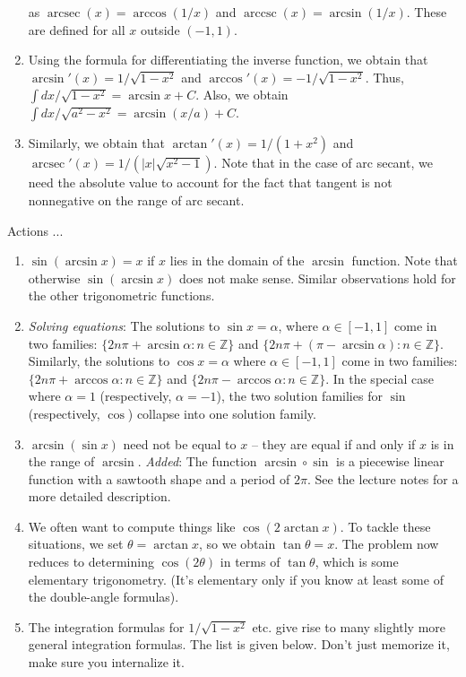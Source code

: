 \documentclass[10pt]{amsart}
\begin{document}
\begin{enumerate}
  as $\operatorname{arcsec}(x) = \arccos(1/x)$ and
  $\operatorname{arccsc}(x) = \arcsin(1/x)$. These are defined for all
  $x$ outside $(-1,1)$.
\item Using the formula for differentiating the inverse function, we
  obtain that $\arcsin'(x) = 1/\sqrt{1 - x^2}$ and $\arccos'(x) =
  -1/\sqrt{1 - x^2}$. Thus, $\int dx/\sqrt{1 - x^2} = \arcsin x +
  C$. Also, we obtain $\int dx/\sqrt{a^2 - x^2} = \arcsin(x/a) + C$.
\item Similarly, we obtain that $\arctan'(x) = 1/(1 + x^2)$ and
  $\operatorname{arcsec}'(x) = 1/(|x|\sqrt{x^2 - 1})$. Note that in
  the case of arc secant, we need the absolute value to account for
  the fact that tangent is not nonnegative on the range of arc secant.
\end{enumerate}

Actions ...

\begin{enumerate}

\item $\sin(\arcsin x) = x$ if $x$ lies in the domain of the $\arcsin$
  function. Note that otherwise $\sin(\arcsin x)$ does not make
  sense. Similar observations hold for the other trigonometric
  functions.
\item {\em Solving equations}: The solutions to $\sin x = \alpha$,
  where $\alpha \in [-1,1]$ come in two families: $\{ 2n\pi + \arcsin
  \alpha : n \in \mathbb{Z} \}$ and $\{ 2n\pi + (\pi - \arcsin \alpha)
  : n \in \mathbb{Z} \}$. Similarly, the solutions to $\cos x =
  \alpha$ where $\alpha \in [-1,1]$ come in two families: $\{ 2n \pi +
  \arccos \alpha: n \in \mathbb{Z} \}$ and $\{ 2n\pi - \arccos \alpha
  : n \in \mathbb{Z} \}$. In the special case where $\alpha = 1$
  (respectively, $\alpha = -1$), the two solution families for $\sin$
  (respectively, $\cos$) collapse into one solution family.
\item $\arcsin(\sin x)$ need not be equal to $x$ -- they are equal if
  and only if $x$ is in the range of $\arcsin$. {\em Added}: The
  function $\arcsin \circ \sin$ is a piecewise linear function with a
  sawtooth shape and a period of $2\pi$. See the lecture notes for a
  more detailed description.
\item We often want to compute things like $\cos(2 \arctan x)$. To
  tackle these situations, we set $\theta = \arctan x$, so we obtain
  $\tan \theta = x$. The problem now reduces to determining
  $\cos(2\theta)$ in terms of $\tan \theta$, which is some elementary
  trigonometry. (It's elementary only if you know at least some of the
  double-angle formulas).
\item The integration formulas for $1/\sqrt{1 - x^2}$ etc. give rise
  to many slightly more general integration formulas. The list is
  given below. Don't just memorize it, make sure you internalize it.
\end{enumerate}
\end{document}
